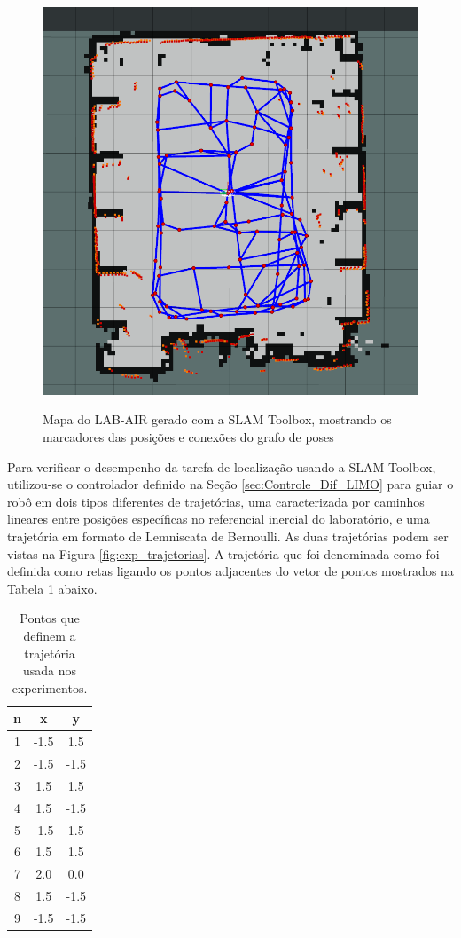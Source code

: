 \begin{figure}[htb]
    \centering
    \caption{Mapa do LAB-AIR gerado com a SLAM Toolbox, mostrando os marcadores das posições e conexões do grafo de poses}
    \includegraphics[width=0.8\linewidth]{img/mapa_localizacao.png}
    \source
    \label{fig:Exp_mapa_LABAIR}
\end{figure}

Para verificar o desempenho da tarefa de localização usando a SLAM Toolbox, utilizou-se o controlador definido na Seção \ref{sec:Controle_Dif_LIMO} para guiar o robô em dois tipos diferentes de trajetórias, uma caracterizada por caminhos lineares entre posições específicas no referencial inercial do laboratório, e uma trajetória em formato de Lemniscata de Bernoulli. As duas trajetórias podem ser vistas na Figura \ref{fig:exp_trajetorias}. A trajetória que foi denominada como  foi definida como retas ligando os pontos adjacentes do vetor de pontos mostrados na Tabela \ref{tab:traj_CASA} abaixo.

\begin{table}
    \centering
    \caption{Pontos que definem a trajetória  usada nos experimentos.}
    \setlength{\extrarowheight}{2pt}
    \begin{tabular}{|c|cc|}
        \hline
        n & x & y \\
        \hline
        1 & -1.5 & \phantom{-}1.5\\
        2 & -1.5 & -1.5 \\ 
        3 & \phantom{-}1.5 & \phantom{-}1.5 \\ 
        4 &  \phantom{-}1.5 & -1.5 \\ 
        5 & -1.5 & \phantom{-}1.5 \\
        6 &  \phantom{-}1.5 & \phantom{-}1.5 \\
        7 &  \phantom{-}2.0 & \phantom{-}0.0 \\
        8 &  \phantom{-}1.5 & -1.5 \\
        9 &  -1.5 & -1.5 \\ \hline
    \end{tabular}
    
    \label{tab:traj_CASA}
    \source
\end{table}


